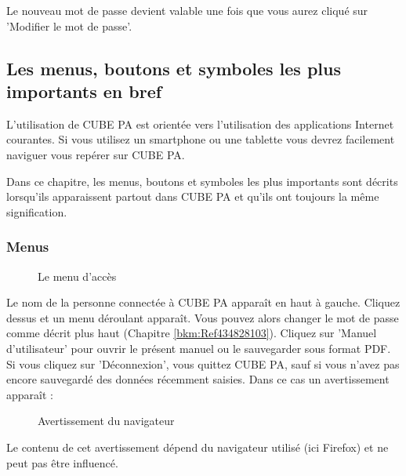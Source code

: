 Le nouveau mot de passe devient valable une fois que vous aurez cliqué sur 'Modifier le mot de passe'.

\subsection{Les menus, boutons et symboles les plus importants en bref}

L'utilisation de CUBE PA est orientée vers l'utilisation des applications Internet courantes. Si vous utilisez un smartphone ou une tablette vous devrez facilement naviguer vous repérer sur CUBE PA.

\vspace{\baselineskip}

Dans ce chapitre, les menus, boutons et symboles les plus importants sont décrits lorsqu'ils apparaissent partout dans CUBE PA et qu'ils ont toujours la même signification.

\pagebreak

\subsubsection{Menus}

\begin{figure}[H]
\caption{Le menu d'accès}
\end{figure}


Le nom de la personne connectée à CUBE PA apparaît en haut à gauche. Cliquez dessus et un menu déroulant apparaît. Vous pouvez alors changer le mot de passe comme décrit plus haut (Chapitre \ref{bkm:Ref434828103}). Cliquez sur 'Manuel d'utilisateur' pour ouvrir le présent manuel ou le sauvegarder sous format PDF. Si vous cliquez sur 'Déconnexion', vous quittez CUBE PA, sauf si vous n'avez pas encore sauvegardé des données récemment saisies. Dans ce cas un avertissement apparaît :

\begin{figure}[H]
\caption{Avertissement du navigateur}
\end{figure}
\begin{small}
Le contenu de cet avertissement dépend du navigateur utilisé (ici Firefox) et ne peut pas être influencé.
\end{small}

